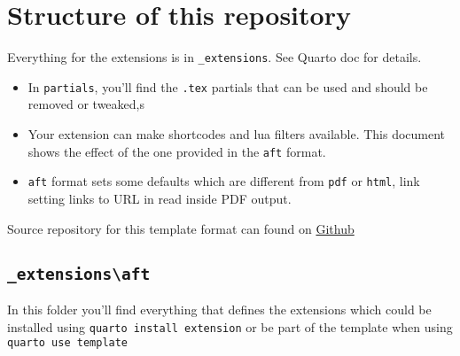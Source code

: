 \documentclass[
  11pts,
]{article}
\begin{document}
\section{Structure of this
repository}\label{structure-of-this-repository}

Everything for the extensions is in \texttt{\_extensions}. See Quarto
doc for details.

\begin{itemize}
\item
  In \texttt{partials}, you'll find the \texttt{.tex} partials that can
  be used and should be removed or tweaked,s
\item
  Your extension can make shortcodes and lua filters available. This
  document shows the effect of the one provided in the \texttt{aft}
  format.
\item
  \texttt{aft} format sets some defaults which are different from
  \texttt{pdf} or \texttt{html}, link setting links to URL in read
  inside PDF output.
\end{itemize}

Source repository for this template format can found on
\href{https://github.com/quarto-journals/article-format-template}{Github}

\subsection{\texorpdfstring{\texttt{\_extensions\textbackslash{}aft}}{\_extensions\textbackslash aft}}\label{extensionsaft}

In this folder you'll find everything that defines the extensions which
could be installed using \texttt{quarto\ install\ extension} or be part
of the template when using \texttt{quarto\ use\ template}
\end{document}
